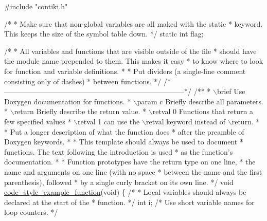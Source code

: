 \begin{DoxyCodeInclude}
\textcolor{preprocessor}{#include "contiki.h"}

\textcolor{comment}{/*}
\textcolor{comment}{ * Make sure that non-global variables are all maked with the static}
\textcolor{comment}{ * keyword. This keeps the size of the symbol table down.}
\textcolor{comment}{ */}
\textcolor{keyword}{static} \textcolor{keywordtype}{int} flag;

\textcolor{comment}{/*}
\textcolor{comment}{ * All variables and functions that are visible outside of the file}
\textcolor{comment}{ * should have the module name prepended to them. This makes it easy}
\textcolor{comment}{ * to know where to look for function and variable definitions.}
\textcolor{comment}{ *}
\textcolor{comment}{ * Put dividers (a single-line comment consisting only of dashes)}
\textcolor{comment}{ * between functions.}
\textcolor{comment}{ */}
\textcolor{comment}{/*---------------------------------------------------------------------------*/}\textcolor{comment}{}
\textcolor{comment}{/**}
\textcolor{comment}{ * \(\backslash\)brief      Use Doxygen documentation for functions.}
\textcolor{comment}{ * \(\backslash\)param c    Briefly describe all parameters.}
\textcolor{comment}{ * \(\backslash\)return     Briefly describe the return value.}
\textcolor{comment}{ * \(\backslash\)retval 0   Functions that return a few specified values}
\textcolor{comment}{ * \(\backslash\)retval 1   can use the \(\backslash\)retval keyword instead of \(\backslash\)return.}
\textcolor{comment}{ *}
\textcolor{comment}{ *             Put a longer description of what the function does}
\textcolor{comment}{ *             after the preamble of Doxygen keywords.}
\textcolor{comment}{ *}
\textcolor{comment}{ *             This template should always be used to document}
\textcolor{comment}{ *             functions. The text following the introduction is used}
\textcolor{comment}{ *             as the function's documentation.}
\textcolor{comment}{ *}
\textcolor{comment}{ *             Function prototypes have the return type on one line,}
\textcolor{comment}{ *             the name and arguments on one line (with no space}
\textcolor{comment}{ *             between the name and the first parenthesis), followed}
\textcolor{comment}{ *             by a single curly bracket on its own line.}
\textcolor{comment}{ */}
\textcolor{keywordtype}{void}
\hyperlink{a00077_gaf4091e5d6984567763b6f5b792d2407f}{code\_style\_example\_function}(\textcolor{keywordtype}{void})
\{
  \textcolor{comment}{/*}
\textcolor{comment}{   * Local variables should always be declared at the start of the}
\textcolor{comment}{   * function.}
\textcolor{comment}{   */}
  \textcolor{keywordtype}{int} i;                   \textcolor{comment}{/* Use short variable names for loop}
\textcolor{comment}{                              counters. */}


\end{DoxyCodeInclude}

